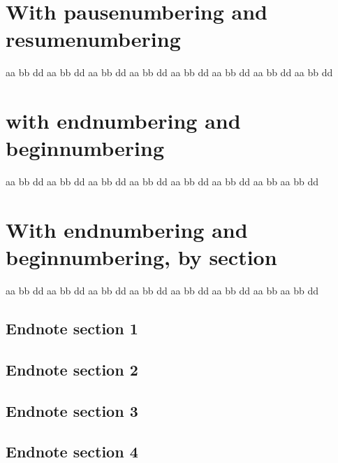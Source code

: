 \documentclass{scrartcl}
\newcommand{\memorybreak}{\pausenumbering\resumenumbering}
\begin{document}
\section{With pausenumbering and resumenumbering}
\beginnumbering
\pstart
aa bb %
 dd aa bb  dd
\pend\memorybreak
\pstart
aa bb %
  dd aa bb  dd
\pend\memorybreak
\pstart
aa bb %
 dd aa bb  dd
\pend\memorybreak
\pstart
aa bb %
  dd aa bb  dd
\pend
\endnumbering


\newpage


\section{with endnumbering and beginnumbering}
\renewcommand{\memorybreak}{\endnumbering\beginnumbering}
\beginnumbering
\pstart
aa bb %
 dd aa bb  dd
\pend\memorybreak
\pstart
aa bb %
  dd aa bb  dd
\pend\memorybreak
\pstart
aa bb %
 dd aa bb  dd
\pend\memorybreak
\pstart
aa bb %
 aa bb  dd
\pend
\endnumbering



\section{With endnumbering and beginnumbering, by section}
\renewcommand{\memorybreak}{\endnumbering\beginnumbering}
\beginnumbering
\pstart
aa bb %
 dd aa bb  dd
\pend\memorybreak
\pstart
aa bb %
  dd aa bb  dd
\pend\memorybreak
\pstart
aa bb %
 dd aa bb  dd
\pend\memorybreak
\pstart
aa bb %
 aa bb  dd
\pend
\endnumbering
\subsection{Endnote section 1}
\subsection{Endnote section 2}
\subsection{Endnote section 3}
\subsection{Endnote section 4}
\end{document}
